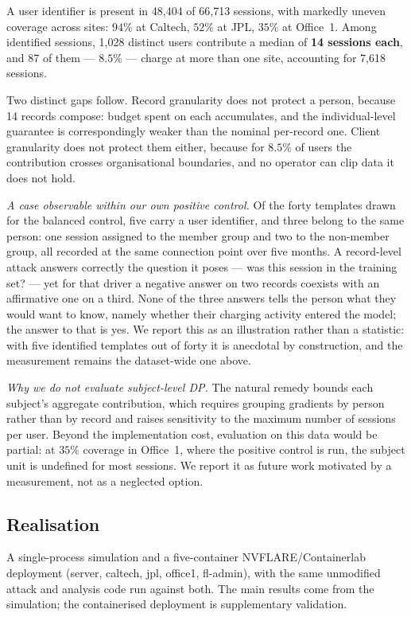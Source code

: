 A user identifier is present in 48{,}404 of 66{,}713 sessions, with markedly
uneven coverage across sites: $94\%$ at Caltech, $52\%$ at JPL, $35\%$ at
Office~1. Among identified sessions, 1{,}028 distinct users contribute a median
of \textbf{14 sessions each}, and 87 of them --- \textbf{$8.5\%$} --- charge at
more than one site, accounting for 7{,}618 sessions.

Two distinct gaps follow. Record granularity does not protect a person, because
14 records compose: budget spent on each accumulates, and the
individual-level guarantee is correspondingly weaker than the nominal
per-record one. Client granularity does not protect them either, because for
$8.5\%$ of users the contribution crosses organisational boundaries, and no
operator can clip data it does not hold.

\emph{A case observable within our own positive control.} Of the forty
templates drawn for the balanced control, five carry a user identifier, and
three belong to the same person: one session assigned to the member group and
two to the non-member group, all recorded at the same connection point over
five months. A record-level attack answers correctly the question it poses ---
was this session in the training set? --- yet for that driver a negative answer
on two records coexists with an affirmative one on a third. None of the three
answers tells the person what they would want to know, namely whether their
charging activity entered the model; the answer to that is yes. We report this
as an illustration rather than a statistic: with five identified templates out
of forty it is anecdotal by construction, and the measurement remains the
dataset-wide one above.

\emph{Why we do not evaluate subject-level DP.} The natural remedy bounds each
subject's aggregate contribution, which requires grouping gradients by person
rather than by record and raises sensitivity to the maximum number of sessions
per user. Beyond the implementation cost, evaluation on this data would be
partial: at $35\%$ coverage in Office~1, where the positive control is run, the
subject unit is undefined for most sessions. We report it as future work
motivated by a measurement, not as a neglected option.

\subsection{Realisation}
\label{sec:setup-realisation}

A single-process simulation and a five-container NVFLARE/Containerlab
deployment (server, caltech, jpl, office1, fl-admin), with the same unmodified
attack and analysis code run against both. The main results come from the
simulation; the containerised deployment is supplementary validation.
